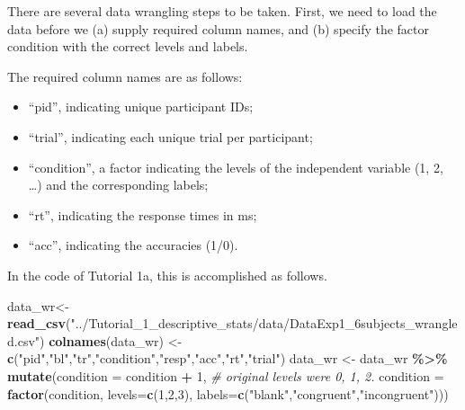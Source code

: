 \documentclass[
  man, donotrepeattitle,floatsintext]{apa6}
\newenvironment{Shaded}{\begin{snugshade}}{\end{snugshade}}
\newcommand{\AttributeTok}[1]{\textcolor[rgb]{0.13,0.29,0.53}{#1}}
\newcommand{\CommentTok}[1]{\textcolor[rgb]{0.56,0.35,0.01}{\textit{#1}}}
\newcommand{\DecValTok}[1]{\textcolor[rgb]{0.00,0.00,0.81}{#1}}
\newcommand{\FunctionTok}[1]{\textcolor[rgb]{0.13,0.29,0.53}{\textbf{#1}}}
\newcommand{\NormalTok}[1]{#1}
\newcommand{\OtherTok}[1]{\textcolor[rgb]{0.56,0.35,0.01}{#1}}
\newcommand{\SpecialCharTok}[1]{\textcolor[rgb]{0.81,0.36,0.00}{\textbf{#1}}}
\newcommand{\StringTok}[1]{\textcolor[rgb]{0.31,0.60,0.02}{#1}}
\providecommand{\tightlist}{%
  \setlength{\itemsep}{0pt}\setlength{\parskip}{0pt}}
\begin{document}
There are several data wrangling steps to be taken. First, we need to load the data before we (a) supply required column names, and (b) specify the factor condition with the correct levels and labels.

The required column names are as follows:

\begin{itemize}
\tightlist
\item
  ``pid'', indicating unique participant IDs;
\item
  ``trial'', indicating each unique trial per participant;
\item
  ``condition'', a factor indicating the levels of the independent variable (1, 2, \ldots) and the corresponding labels;
\item
  ``rt'', indicating the response times in ms;
\item
  ``acc'', indicating the accuracies (1/0).
\end{itemize}

In the code of Tutorial 1a, this is accomplished as follows.

\footnotesize

\begin{Shaded}
\begin{Highlighting}[]
\NormalTok{data\_wr}\OtherTok{\textless{}{-}}\FunctionTok{read\_csv}\NormalTok{(}\StringTok{"../Tutorial\_1\_descriptive\_stats/data/DataExp1\_6subjects\_wrangled.csv"}\NormalTok{)}
\FunctionTok{colnames}\NormalTok{(data\_wr) }\OtherTok{\textless{}{-}} \FunctionTok{c}\NormalTok{(}\StringTok{"pid"}\NormalTok{,}\StringTok{"bl"}\NormalTok{,}\StringTok{"tr"}\NormalTok{,}\StringTok{"condition"}\NormalTok{,}\StringTok{"resp"}\NormalTok{,}\StringTok{"acc"}\NormalTok{,}\StringTok{"rt"}\NormalTok{,}\StringTok{"trial"}\NormalTok{) }
\NormalTok{data\_wr }\OtherTok{\textless{}{-}}\NormalTok{ data\_wr }\SpecialCharTok{\%\textgreater{}\%} 
  \FunctionTok{mutate}\NormalTok{(}\AttributeTok{condition =}\NormalTok{ condition }\SpecialCharTok{+} \DecValTok{1}\NormalTok{, }\CommentTok{\# original levels were 0, 1, 2.}
         \AttributeTok{condition =} \FunctionTok{factor}\NormalTok{(condition, }
                            \AttributeTok{levels=}\FunctionTok{c}\NormalTok{(}\DecValTok{1}\NormalTok{,}\DecValTok{2}\NormalTok{,}\DecValTok{3}\NormalTok{), }
                            \AttributeTok{labels=}\FunctionTok{c}\NormalTok{(}\StringTok{"blank"}\NormalTok{,}\StringTok{"congruent"}\NormalTok{,}\StringTok{"incongruent"}\NormalTok{)))}
\end{Highlighting}
\end{Shaded}
\end{document}
